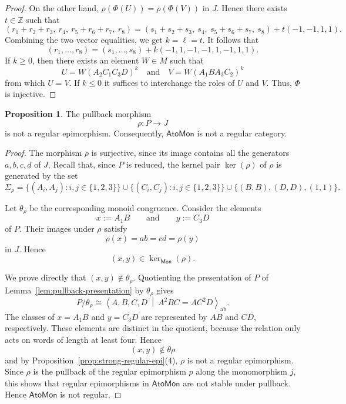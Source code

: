 \documentclass[a4paper,10pt,reqno]{amsart}
\theoremstyle{definition}
\newtheorem{proposition}[theorem]{Proposition}
\theoremstyle{remark}
\newcommand{\AtoMon}{\mathsf{AtoMon}}
\newcommand{\Mon}{\mathsf{Mon}}
\begin{document}
\begin{proof}
On the other hand, $\rho(\Phi(U))=\rho(\Phi(V))$ in $J$.
Hence there exists $t\in\mathbb Z$ such that
$$
(r_1+r_2+r_3,\ r_4,\ r_5+r_6+r_7,\ r_8) = (s_1+s_2+s_3,\ s_4,\ s_5+s_6+s_7,\ s_8) +t(-1,-1,1,1).
$$
Combining the two vector equalities, we get $k=\ell=t$. It follows that
$$
(r_1,\ldots,r_8) = (s_1,\ldots,s_8) +k(-1,1,-1,-1,1,-1,1,1).
$$
If $k \geq 0$, then there exists an element $W \in M$ such that
$$
U=W(A_2C_1C_3D)^k \quad \text{and} \quad V=W(A_1BA_3C_2)^k
$$
from which $U=V$. If $k\leq 0$ it suffices to interchange the roles of $U$ and $V$. Thus, $\Phi$ is injective.
\end{proof}

\begin{proposition}\label{prop:not-regular}
The pullback morphism
$$
 \rho:P\to J
$$
is not a regular epimorphism. Consequently, $\AtoMon$ is not a regular
category.
\end{proposition}

\begin{proof}
The morphism $\rho$ is surjective, since its image contains all the generators $a,b,c,d$ of $J$.
Recall that, since $P$ is reduced, the kernel pair $\ker(\rho)$ of $\rho$ is generated by the set
$$
\Sigma_\rho=\{(A_i,A_j):i,j\in\{1,2,3\}\}
 \cup
 \{(C_i,C_j):i,j\in\{1,2,3\}\} \cup \{(B,B), (D,D), (1,1)\}.
$$

Let $\theta_\rho$ be the corresponding monoid congruence. Consider the elements
$$
 x:=A_1B
 \qquad\text{and}\qquad
 y:=C_3D
$$
of $P$. Their images under $\rho$ satisfy
$$
 \rho(x)=ab=cd=\rho(y)
$$
in $J$. Hence
$$
 (x,y)\in\ker_{\Mon}(\rho).
$$

We prove directly that $(x,y)\notin\theta_\rho$.  Quotienting the
presentation of $P$ of Lemma~\ref{lem:pullback-presentation} by $\theta_\rho$ gives
$$
 P/\theta_\rho\cong
 \left\langle
 A,B,C,D
 \ \middle|\
 A^2BC=AC^2D
 \right\rangle_{\mathrm{ab}}.
$$
The classes of $x=A_1B$ and $y=C_3D$ are represented by $AB$ and
$CD$, respectively.  These elements are distinct in the quotient, because the relation only acts on words of length at least four. Hence 
$$
 (x,y)\notin\theta\rho
$$
and by Proposition~\ref{prop:strong-regular-epi}(4), $\rho$ is not a regular epimorphism.
Since $\rho$ is the pullback of the regular epimorphism $p$ along the monomorphism $j$, this shows that regular epimorphisms in $\AtoMon$ are not stable under pullback. Hence $\AtoMon$ is not regular.
\end{proof}
\end{document}
